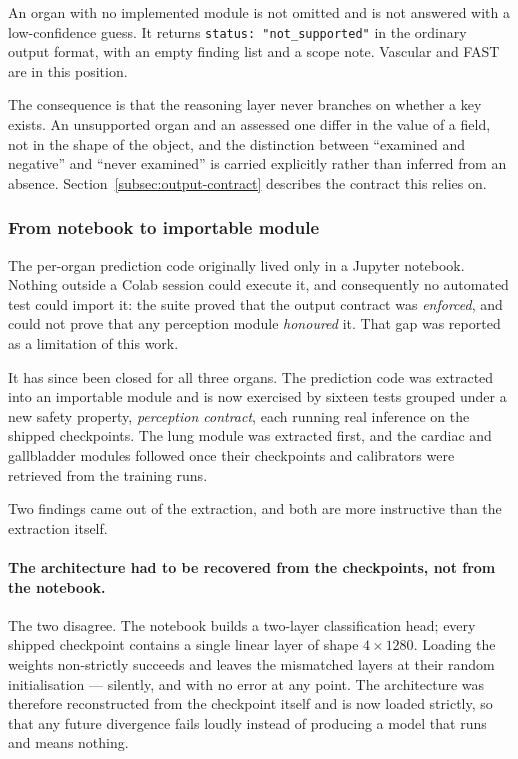 An organ with no implemented module is not omitted and is not answered with a low-confidence
guess. It returns \texttt{status: "not\_supported"} in the ordinary output format, with an
empty finding list and a scope note. Vascular and FAST are in this position.

The consequence is that the reasoning layer never branches on whether a key exists. An
unsupported organ and an assessed one differ in the value of a field, not in the shape of the
object, and the distinction between ``examined and negative'' and ``never examined'' is carried
explicitly rather than inferred from an absence. Section~\ref{subsec:output-contract} describes
the contract this relies on.

\subsubsection{From notebook to importable module}
\label{subsubsec:agent-extraction}

The per-organ prediction code originally lived only in a Jupyter notebook. Nothing outside a
Colab session could execute it, and consequently no automated test could import it: the suite
proved that the output contract was \emph{enforced}, and could not prove that any perception
module \emph{honoured} it. That gap was reported as a limitation of this work.

It has since been closed for all three organs. The prediction code was extracted into an
importable module and is now exercised by sixteen tests grouped under a new safety property,
\emph{perception contract}, each running real inference on the shipped checkpoints. The lung
module was extracted first, and the cardiac and gallbladder modules followed once their
checkpoints and calibrators were retrieved from the training runs.

Two findings came out of the extraction, and both are more instructive than the extraction
itself.

\paragraph{The architecture had to be recovered from the checkpoints, not from the notebook.}
The two disagree. The notebook builds a two-layer classification head; every shipped checkpoint
contains a single linear layer of shape $4 \times 1280$. Loading the weights non-strictly
succeeds and leaves the mismatched layers at their random initialisation --- silently, and with
no error at any point. The architecture was therefore reconstructed from the checkpoint itself
and is now loaded strictly, so that any future divergence fails loudly instead of producing a
model that runs and means nothing.

